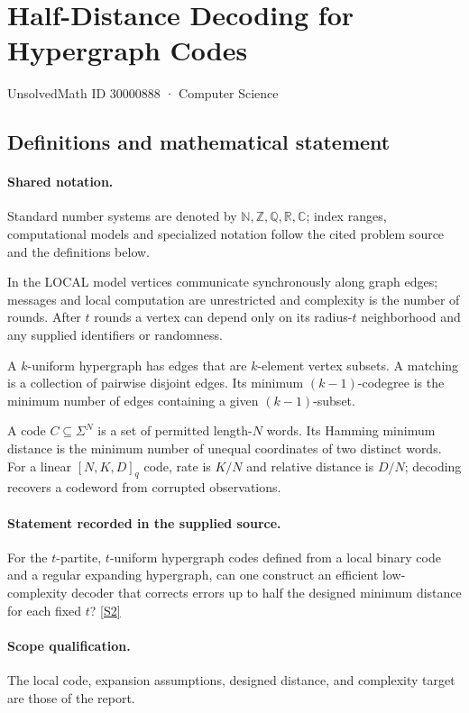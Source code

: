 \documentclass[11pt]{article}
\newcommand{\sref}[2]{\hyperlink{source:#1:#2}{[S#2]}}
\begin{document}
\setcounter{section}{30000887}
\section{Half-Distance Decoding for Hypergraph Codes}\label{30000888}
{\small\sffamily UnsolvedMath ID 30000888 · Computer Science}
\subsection{Definitions and mathematical statement}

\paragraph{Shared notation.}Standard number systems are denoted by $\mathbb N,\mathbb Z,\mathbb Q,\mathbb R,\mathbb C$; index ranges, computational models and specialized notation follow the cited problem source and the definitions below.


In the LOCAL model vertices communicate synchronously along graph edges; messages and local computation are unrestricted and complexity is the number of rounds. After $t$ rounds a vertex can depend only on its radius-$t$ neighborhood and any supplied identifiers or randomness.

A $k$-uniform hypergraph has edges that are $k$-element vertex subsets. A matching is a collection of pairwise disjoint edges. Its minimum $(k-1)$-codegree is the minimum number of edges containing a given $(k-1)$-subset.

A code $C\subseteq\Sigma^N$ is a set of permitted length-$N$ words. Its Hamming minimum distance is the minimum number of unequal coordinates of two distinct words. For a linear $[N,K,D]_q$ code, rate is $K/N$ and relative distance is $D/N$; decoding recovers a codeword from corrupted observations.
\paragraph{Statement recorded in the supplied source.}
For the $t$-partite, $t$-uniform hypergraph codes defined from a local binary code and a regular expanding hypergraph, can one construct an efficient low-complexity decoder that corrects errors up to half the designed minimum distance for each fixed $t$? \sref{30000888}{2}
\paragraph{Scope qualification.}
The local code, expansion assumptions, designed distance, and complexity target are those of the report.
\end{document}

